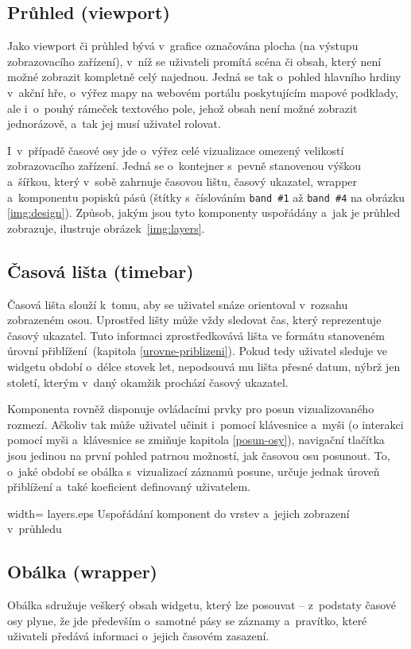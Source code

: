 		\subsection{Průhled (viewport)}
			\label{viewport}
			Jako viewport či průhled bývá v~grafice označována plocha (na výstupu zobrazovacího zařízení), v~níž se uživateli promítá scéna či obsah, který není možné zobrazit kompletně celý najednou. Jedná se tak o~pohled hlavního hrdiny v~akční hře, o~výřez mapy na webovém portálu poskytujícím mapové podklady, ale i~o~pouhý rámeček textového pole, jehož obsah není možné zobrazit jednorázově, a~tak jej musí uživatel rolovat.
			
		 I~v~případě časové osy jde o~výřez celé vizualizace omezený velikostí zobrazovacího zařízení. Jedná se o~kontejner s~pevně stanovenou výškou a~šířkou, který v~sobě zahrnuje časovou lištu, časový ukazatel, wrapper a~komponentu popisků pásů (štítky s~číslováním {\tt band \#1} až {\tt band \#4} na obrázku \ref{img:design}). Způsob, jakým jsou tyto komponenty uspořádány a~jak je průhled zobrazuje, ilustruje obrázek~\ref{img:layers}.
		
		\subsection{Časová lišta (timebar)}
		\label{casova-lista}
			Časová lišta slouží k~tomu, aby se uživatel snáze orientoval v~rozsahu zobrazeném osou. Uprostřed lišty může vždy sledovat čas, který reprezentuje časový ukazatel. Tuto informaci zprostředkovává lišta ve formátu stanoveném úrovní přiblížení~(kapitola \ref{urovne-priblizeni}). Pokud tedy uživatel sleduje ve widgetu období o~délce stovek let, nepodsouvá mu lišta přesné datum, nýbrž jen století, kterým v~daný okamžik prochází časový ukazatel.
			
			Komponenta rovněž disponuje ovládacími prvky pro posun vizualizovaného rozmezí. Ačkoliv tak může uživatel učinit i~pomocí klávesnice a~myši (o interakci pomocí myši a~klávesnice se zmiňuje kapitola \ref{posun-osy}), navigační tlačítka jsou jedinou na první pohled patrnou možností, jak časovou osu posunout. To, o~jaké období se obálka s~vizualizací záznamů posune, určuje jednak úroveň přiblížení a~také koeficient definovaný uživatelem.
			
				{width=\textwidth}
				{layers.eps}
				{Uspořádání komponent do vrstev a~jejich zobrazení v~průhledu}
				{}
			
		\subsection{Obálka (wrapper)}
			\label{wrapper}
			Obálka sdružuje veškerý obsah widgetu, který lze posouvat -- z~podstaty časové osy plyne, že jde především o~samotné pásy se záznamy a~pravítko, které uživateli předává informaci o~jejich časovém zasazení.
			
